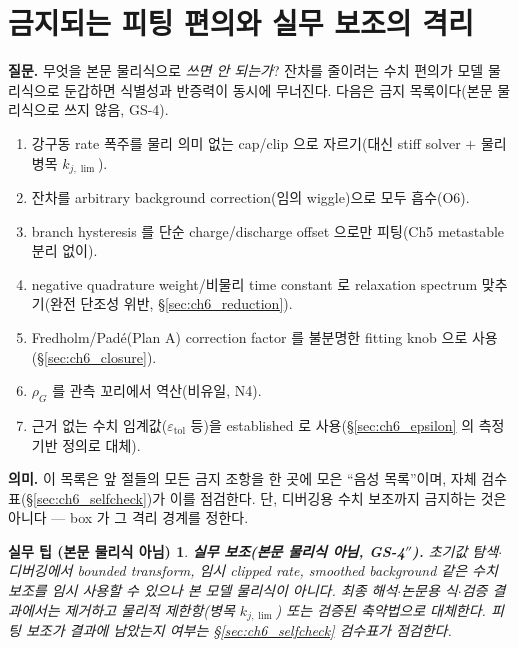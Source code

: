 \documentclass[11pt,a4paper]{article}
\newtheorem*{practicebox}{실무 팁 (본문 물리식 아님)}
\newcommand{\tol}{\mathrm{tol}}
\begin{document}
\section{금지되는 피팅 편의와 실무 보조의 격리}\label{sec:ch6_forbidden}
\textbf{질문.} 무엇을 본문 물리식으로 \emph{쓰면 안 되는가}? 잔차를 줄이려는 수치 편의가 모델 물리식으로 둔갑하면
식별성과 반증력이 동시에 무너진다. 다음은 금지 목록이다(본문 물리식으로 쓰지 않음, GS-4).
\begin{enumerate}[label=(\arabic*),leftmargin=2.4em]
\item 강구동 rate 폭주를 물리 의미 없는 cap/clip 으로 자르기(대신 stiff solver $+$ 물리 병목 $k_{j,\lim}$).
\item 잔차를 arbitrary background correction(임의 wiggle)으로 모두 흡수(O6).
\item branch hysteresis 를 단순 charge/discharge offset 으로만 피팅(Ch5 metastable 분리 없이).
\item negative quadrature weight/비물리 time constant 로 relaxation spectrum 맞추기(완전 단조성 위반, \S\ref{sec:ch6_reduction}).
\item Fredholm/Padé(Plan A) correction factor 를 불분명한 fitting knob 으로 사용(\S\ref{sec:ch6_closure}).
\item $\rho_G$ 를 관측 꼬리에서 역산(비유일, N4).
\item 근거 없는 수치 임계값($\varepsilon_\tol$ 등)을 established 로 사용(\S\ref{sec:ch6_epsilon} 의 측정 기반 정의로 대체).
\end{enumerate}
\textbf{의미.} 이 목록은 앞 절들의 모든 금지 조항을 한 곳에 모은 ``음성 목록''이며, 자체 검수표(\S\ref{sec:ch6_selfcheck})가
이를 점검한다. 단, 디버깅용 수치 보조까지 금지하는 것은 아니다 — box 가 그 격리 경계를 정한다.
\begin{practicebox}
\textbf{실무 보조(본문 물리식 아님, GS-4$''$).} 초기값 탐색$\cdot$디버깅에서 bounded transform, 임시 clipped rate,
smoothed background 같은 수치 보조를 \emph{임시} 사용할 수 있으나 본 모델 물리식이 아니다. 최종 해석$\cdot$논문용
식$\cdot$검증 결과에서는 제거하고 물리적 제한항(병목 $k_{j,\lim}$) 또는 검증된 축약법으로 대체한다. 피팅 보조가
결과에 남았는지 여부는 \S\ref{sec:ch6_selfcheck} 검수표가 점검한다.
\end{practicebox}

\end{document}
